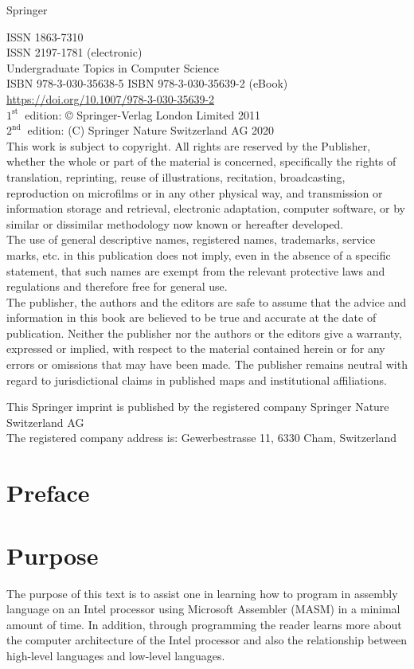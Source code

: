 \documentclass[10pt]{article}
\begin{document}
Springer

ISSN 1863-7310\\
ISSN 2197-1781 (electronic)\\
Undergraduate Topics in Computer Science\\
ISBN 978-3-030-35638-5 ISBN 978-3-030-35639-2 (eBook)\\
\href{https://doi.org/10.1007/978-3-030-35639-2}{https://doi.org/10.1007/978-3-030-35639-2}\\
$1^{\text {st }}$ edition: © Springer-Verlag London Limited 2011\\
$2^{\text {nd }}$ edition: (C) Springer Nature Switzerland AG 2020\\
This work is subject to copyright. All rights are reserved by the Publisher, whether the whole or part of the material is concerned, specifically the rights of translation, reprinting, reuse of illustrations, recitation, broadcasting, reproduction on microfilms or in any other physical way, and transmission or information storage and retrieval, electronic adaptation, computer software, or by similar or dissimilar methodology now known or hereafter developed.\\
The use of general descriptive names, registered names, trademarks, service marks, etc. in this publication does not imply, even in the absence of a specific statement, that such names are exempt from the relevant protective laws and regulations and therefore free for general use.\\
The publisher, the authors and the editors are safe to assume that the advice and information in this book are believed to be true and accurate at the date of publication. Neither the publisher nor the authors or the editors give a warranty, expressed or implied, with respect to the material contained herein or for any errors or omissions that may have been made. The publisher remains neutral with regard to jurisdictional claims in published maps and institutional affiliations.

This Springer imprint is published by the registered company Springer Nature Switzerland AG\\
The registered company address is: Gewerbestrasse 11, 6330 Cham, Switzerland

\section*{Preface}
\section*{Purpose}
The purpose of this text is to assist one in learning how to program in assembly language on an Intel processor using Microsoft Assembler (MASM) in a minimal amount of time. In addition, through programming the reader learns more about the computer architecture of the Intel processor and also the relationship between high-level languages and low-level languages.
\end{document}
